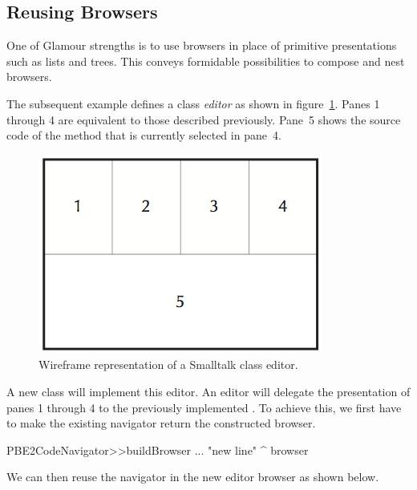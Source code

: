 \documentclass[a4paper,10pt,twoside]{book}
\begin{document}
\subsection{Reusing Browsers}
\label{sec:tutorial/reusing-browsers}

One of  Glamour strengths is to use browsers in
place of primitive presentations such as lists and trees. This conveys formidable possibilities to compose and nest browsers.

The subsequent example defines a class \emph{editor} as shown
in figure~\ref{fig:classbrowser_wireframe}. Panes 1 through 4 are
equivalent to those described previously. Pane~5 shows the source code
of the method that is currently selected in pane~4.

\begin{figure}[htbp]
\centerline{\includegraphics[width=\linewidth]{classbrowser_wireframe.png}}
\caption{Wireframe representation of a Smalltalk class editor.}
\label{fig:classbrowser_wireframe}
\end{figure}

A new class  will implement this editor. An editor will delegate the presentation
of panes 1 through 4 to the previously implemented
. To achieve this, we first have to make the
existing navigator return the constructed browser. 

\begin{code}{}
PBE2CodeNavigator>>buildBrowser
  ...
  "new line"
  ^ browser 
\end{code}

We can then reuse the navigator in the new editor browser as shown
below.
\end{document}
